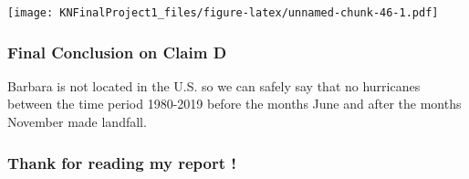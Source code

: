\documentclass[
]{article}
\begin{document}
\texttt{[image: KNFinalProject1\_files/figure-latex/unnamed-chunk-46-1.pdf]}

\hypertarget{final-conclusion-on-claim-d}{%
\subsubsection{Final Conclusion on Claim
D}\label{final-conclusion-on-claim-d}}

Barbara is not located in the U.S. so we can safely say that no
hurricanes between the time period 1980-2019 before the months June and
after the months November made landfall.

\hypertarget{thank-for-reading-my-report}{%
\subsubsection{Thank for reading my report
!}\label{thank-for-reading-my-report}}
\end{document}
